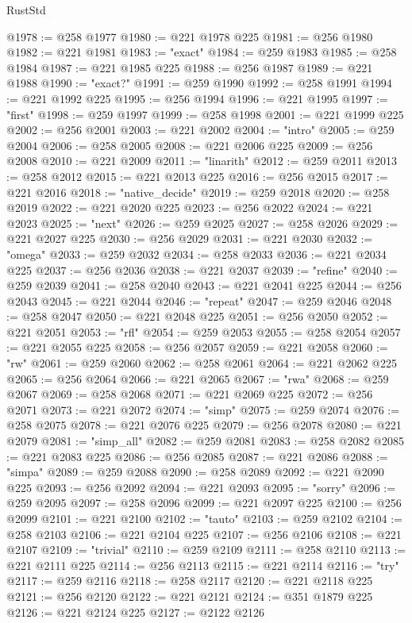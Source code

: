 \begin{lexlean}{RustStd}
\begin{coremodule}
@1978 := @258 @1977
@1980 := @221 @1978 @225
@1981 := @256 @1980
@1982 := @221 @1981
@1983 := "exact"
@1984 := @259 @1983
@1985 := @258 @1984
@1987 := @221 @1985 @225
@1988 := @256 @1987
@1989 := @221 @1988
@1990 := "exact?"
@1991 := @259 @1990
@1992 := @258 @1991
@1994 := @221 @1992 @225
@1995 := @256 @1994
@1996 := @221 @1995
@1997 := "first"
@1998 := @259 @1997
@1999 := @258 @1998
@2001 := @221 @1999 @225
@2002 := @256 @2001
@2003 := @221 @2002
@2004 := "intro"
@2005 := @259 @2004
@2006 := @258 @2005
@2008 := @221 @2006 @225
@2009 := @256 @2008
@2010 := @221 @2009
@2011 := "linarith"
@2012 := @259 @2011
@2013 := @258 @2012
@2015 := @221 @2013 @225
@2016 := @256 @2015
@2017 := @221 @2016
@2018 := "native_decide"
@2019 := @259 @2018
@2020 := @258 @2019
@2022 := @221 @2020 @225
@2023 := @256 @2022
@2024 := @221 @2023
@2025 := "next"
@2026 := @259 @2025
@2027 := @258 @2026
@2029 := @221 @2027 @225
@2030 := @256 @2029
@2031 := @221 @2030
@2032 := "omega"
@2033 := @259 @2032
@2034 := @258 @2033
@2036 := @221 @2034 @225
@2037 := @256 @2036
@2038 := @221 @2037
@2039 := "refine"
@2040 := @259 @2039
@2041 := @258 @2040
@2043 := @221 @2041 @225
@2044 := @256 @2043
@2045 := @221 @2044
@2046 := "repeat"
@2047 := @259 @2046
@2048 := @258 @2047
@2050 := @221 @2048 @225
@2051 := @256 @2050
@2052 := @221 @2051
@2053 := "rfl"
@2054 := @259 @2053
@2055 := @258 @2054
@2057 := @221 @2055 @225
@2058 := @256 @2057
@2059 := @221 @2058
@2060 := "rw"
@2061 := @259 @2060
@2062 := @258 @2061
@2064 := @221 @2062 @225
@2065 := @256 @2064
@2066 := @221 @2065
@2067 := "rwa"
@2068 := @259 @2067
@2069 := @258 @2068
@2071 := @221 @2069 @225
@2072 := @256 @2071
@2073 := @221 @2072
@2074 := "simp"
@2075 := @259 @2074
@2076 := @258 @2075
@2078 := @221 @2076 @225
@2079 := @256 @2078
@2080 := @221 @2079
@2081 := "simp_all"
@2082 := @259 @2081
@2083 := @258 @2082
@2085 := @221 @2083 @225
@2086 := @256 @2085
@2087 := @221 @2086
@2088 := "simpa"
@2089 := @259 @2088
@2090 := @258 @2089
@2092 := @221 @2090 @225
@2093 := @256 @2092
@2094 := @221 @2093
@2095 := "sorry"
@2096 := @259 @2095
@2097 := @258 @2096
@2099 := @221 @2097 @225
@2100 := @256 @2099
@2101 := @221 @2100
@2102 := "tauto"
@2103 := @259 @2102
@2104 := @258 @2103
@2106 := @221 @2104 @225
@2107 := @256 @2106
@2108 := @221 @2107
@2109 := "trivial"
@2110 := @259 @2109
@2111 := @258 @2110
@2113 := @221 @2111 @225
@2114 := @256 @2113
@2115 := @221 @2114
@2116 := "try"
@2117 := @259 @2116
@2118 := @258 @2117
@2120 := @221 @2118 @225
@2121 := @256 @2120
@2122 := @221 @2121
@2124 := @351 @1879 @225
@2126 := @221 @2124 @225
@2127 := @2122 @2126

\end{coremodule}
\end{lexlean}
